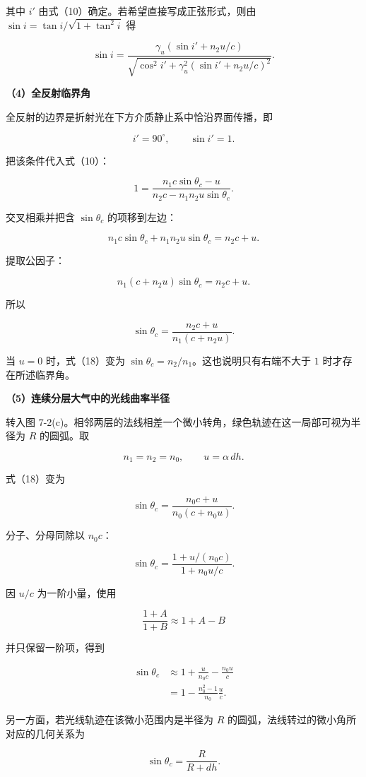 \documentclass[12pt,a4paper,UTF8]{ctexart}
\begin{document}
其中 \(i'\) 由式（10）确定。若希望直接写成正弦形式，则由
\(\sin i=\tan i/\sqrt{1+\tan^2i}\) 得

\[
\boxed{
\sin i=
\frac{\gamma_u(\sin i'+n_2u/c)}
{\sqrt{\cos^2i'+\gamma_u^2(\sin i'+n_2u/c)^2}}
}.
\tag{16}
\]

\textbf{（4）全反射临界角}

全反射的边界是折射光在下方介质静止系中恰沿界面传播，即

\[
i'=90^\circ,\qquad \sin i'=1.
\]

把该条件代入式（10）：

\[
1=\frac{n_1c\sin\theta_c-u}
{n_2c-n_1n_2u\sin\theta_c}.
\tag{17}
\]

交叉相乘并把含 \(\sin\theta_c\) 的项移到左边：

\[
n_1c\sin\theta_c+n_1n_2u\sin\theta_c
=n_2c+u.
\]

提取公因子：

\[
n_1(c+n_2u)\sin\theta_c=n_2c+u.
\]

所以

\[
\boxed{
\sin\theta_c=\frac{n_2c+u}{n_1(c+n_2u)}
}.
\tag{18}
\]

当 \(u=0\) 时，式（18）变为
\(\sin\theta_c=n_2/n_1\)。这也说明只有右端不大于 \(1\)
时才存在所述临界角。

\textbf{（5）连续分层大气中的光线曲率半径}

转入图
7-2(c)。相邻两层的法线相差一个微小转角，绿色轨迹在这一局部可视为半径为
\(R\) 的圆弧。取

\[
n_1=n_2=n_0,\qquad u=\alpha\,dh.
\]

式（18）变为

\[
\sin\theta_c=\frac{n_0c+u}
{n_0(c+n_0u)}.
\tag{19}
\]

分子、分母同除以 \(n_0c\)：

\[
\sin\theta_c=
\frac{1+u/(n_0c)}{1+n_0u/c}.
\tag{20}
\]

因 \(u/c\) 为一阶小量，使用

\[
\frac{1+A}{1+B}\approx1+A-B
\]

并只保留一阶项，得到

\[
\begin{aligned}
\sin\theta_c
&\approx1+\frac{u}{n_0c}-\frac{n_0u}{c}\\
&=1-\frac{n_0^2-1}{n_0}\frac{u}{c}.
\end{aligned}\tag{21}
\]

另一方面，若光线轨迹在该微小范围内是半径为 \(R\)
的圆弧，法线转过的微小角所对应的几何关系为

\[
\sin\theta_c=\frac{R}{R+dh}.
\tag{22}
\]
\end{document}
